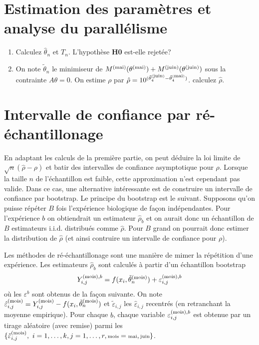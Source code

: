 \documentclass{article}
\newcommand{\mois}{\textrm{\scriptsize mois}}
\newcommand{\mai}{\textrm{\scriptsize mai}}
\newcommand{\juin}{\textrm{\scriptsize juin}}
\begin{document}
\section{Estimation des param\`etres et analyse du parall\'elisme}
\begin{enumerate}
\item Calculez $\hat\theta_{n}$ et $T_{n}$. L'hypoth\`ese {\bf H0} est-elle rejet\'ee?
\item On note $\tilde\theta_{n}$ le minimiseur de $M^{(\mai)}(\theta^{(\mai)})+M^{(\juin)}(\theta^{(\juin)})$ sous la contrainte $A\theta=0$. On estime $\rho$ par $\hat\rho=10^{(\tilde\theta_{4}^{(\juin)}-\tilde\theta_{4}^{(\mai)})}$. calculez $\hat \rho$.
\end{enumerate}

\section{Intervalle de confiance par r\'e-\'echantillonage}
En adaptant les calculs de la premi\`ere partie, on peut d\'eduire la loi limite de $\sqrt{n}(\hat \rho-\rho)$ et batir des intervalles de confiance asymptotique pour $\rho$. Lorsque la taille $n$ de l'\'echantillon est faible, cette approximation n'est cependant pas valide. Dans ce cas, une alternative int\'eressante est de construire un intervalle de confiance par bootstrap. Le principe du bootstrap est le suivant. Supposons qu'on puisse r\'ep\'eter $B$ fois l'exp\'erience biologique de fa\c{c}on ind\'ependantes. Pour l'exp\'erience $b$ on obtiendrait un estimateur $\hat\rho_{b}$ et on aurait donc un \'echantillon de $B$ estimateurs i.i.d. distribu\'es comme $\hat \rho$. Pour $B$ grand on pourrait donc estimer la distribution de $\hat \rho$ (et ainsi contruire un intervalle de confiance pour $\rho$). 

Les m\'ethodes de r\'e-\'echantillonage sont une mani\`ere de mimer la r\'ep\'etition d'une exp\'erience. Les estimateurs $\hat\rho_{b}$ sont calcul\'es \`a partir d'un \'echantillon bootstrap
$$Y_{i,j}^{(\mois),b}=f(x_{i},\tilde\theta_{n}^{(\mois)})+\varepsilon_{i,j}^{(\mois),b}$$
o\`u les $\varepsilon^{b}$ sont obtenus de la fa\c{c}on suivante.  On note $\hat\varepsilon_{i,j}^{(\mois)}=Y_{i,j}^{(\mois)}-f(x_{i},\tilde\theta_{n}^{(\mois)})$ et $\tilde\varepsilon_{i,j}$ les $\hat\varepsilon_{i,j}$ recentr\'es (en retranchant la moyenne empirique). Pour chaque $b$, chaque variable $\varepsilon_{i,j}^{(\mois), b}$ est obtenue par un tirage al\'eatoire (avec remise) parmi les $\{\tilde \varepsilon_{i,j}^{(\mois)},\ i=1,\ldots,k, j=1,\ldots,r, \mois=\mai,\juin\}$. 
\end{document}
